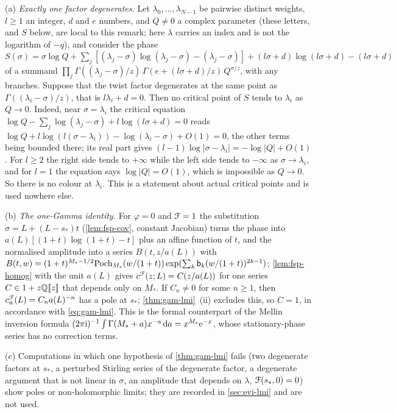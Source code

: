 \begin{rmk}
\label{rmk:gam-necessity}
(a) \emph{Exactly one factor degenerates.} Let $\lambda_0,\dots,\lambda_{N-1}$ be pairwise distinct weights, $l\geq 1$ an integer, $d$ and $e$ numbers, and $Q\neq 0$ a complex parameter (these letters, and $S$ below, are local to this remark; here $\lambda$ carries an index and is not the logarithm of $-q$), and consider the phase $S(\sigma)=\sigma\log Q+\sum_j[(\lambda_j-\sigma)\log(\lambda_j-\sigma)-(\lambda_j-\sigma)]+(l\sigma+d)\log(l\sigma+d)-(l\sigma+d)$ of a summand $\prod_j\Gamma((\lambda_j-\sigma)/z)\,\Gamma(e+(l\sigma+d)/z)\,Q^{\sigma/z}$, with any branches. Suppose that the twist factor degenerates at the same point as $\Gamma((\lambda_i-\sigma)/z)$, that is $l\lambda_i+d=0$. Then no critical point of $S$ tends to $\lambda_i$ as $Q\to 0$. Indeed, near $\sigma=\lambda_i$ the critical equation $\log Q-\sum_j\log(\lambda_j-\sigma)+l\log(l\sigma+d)=0$ reads $\log Q+l\log(l(\sigma-\lambda_i))-\log(\lambda_i-\sigma)+O(1)=0$, the other terms being bounded there; its real part gives $(l-1)\log|\sigma-\lambda_i|=-\log|Q|+O(1)$. For $l\geq 2$ the right side tends to $+\infty$ while the left side tends to $-\infty$ as $\sigma\to\lambda_i$, and for $l=1$ the equation says $\log|Q|=O(1)$, which is impossible as $Q\to 0$. So there is no colour at $\lambda_i$. This is a statement about actual critical points and is used nowhere else.

(b) \emph{The one-Gamma identity.} For $\varphi=0$ and $\mathcal{F}=1$ the substitution $\sigma=L+(L-s_*)t$ (\cref{lem:fsp-cov}, constant Jacobian) turns the phase into $a(L)[(1+t)\log(1+t)-t]$ plus an affine function of $t$, and the normalised amplitude into a series $B(t,z/a(L))$ with $B(t,w)=(1+t)^{M_*-1/2}\mathrm{Poch}_{M_*}(w/(1+t))\exp(\sum_k\mathsf{b}_k(w/(1+t))^{2k-1})$; \cref{lem:fsp-homog} with the unit $a(L)$ gives $c^{\mathcal{F}}(z;L)=C(z/a(L))$ for one series $C\in 1+z\mathbb{Q}[\![ z ]\!]$ that depends only on $M_*$. If $C_n\neq 0$ for some $n\geq 1$, then $c^{\mathcal{F}}_n(L)=C_na(L)^{-n}$ has a pole at $s_*$; \cref{thm:gam-lmi}~(ii) excludes this, so $C=1$, in accordance with \eqref{eq:gam-lmi}. This is the formal counterpart of the Mellin inversion formula $(2\pi\mathrm{i})^{-1}\int\Gamma(M_*+a)x^{-a}\,\mathrm{d} a=x^{M_*}\mathrm{e}^{-x}$, whose stationary-phase series has no correction terms.

(c) Computations in which one hypothesis of \cref{thm:gam-lmi} fails (two degenerate factors at $s_*$, a perturbed Stirling series of the degenerate factor, a degenerate argument that is not linear in $\sigma$, an amplitude that depends on $\lambda$, $\mathcal{F}(s_*,0)=0$) show poles or non-holomorphic limits; they are recorded in \cref{sec:evi-lmi} and are not used.
\end{rmk}

